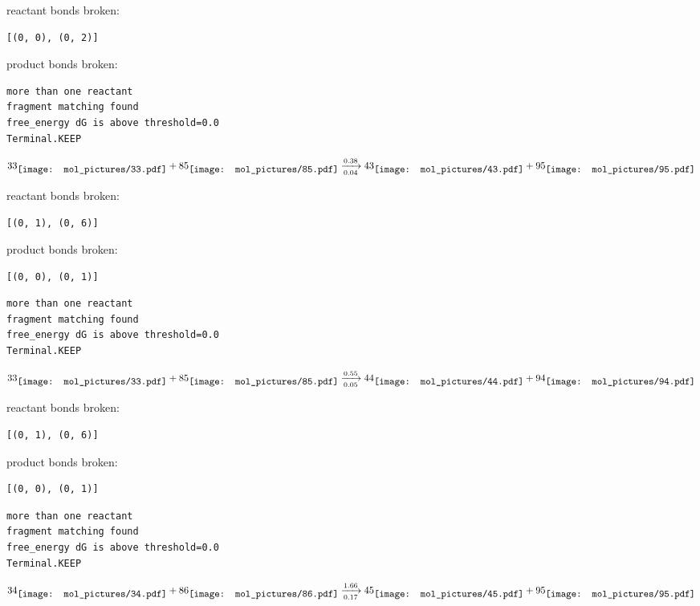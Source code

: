 \documentclass{article}
\begin{document}
reactant bonds broken:\begin{verbatim}
[(0, 0), (0, 2)]
\end{verbatim}
product bonds broken:



\vspace{1cm}
\begin{verbatim}
more than one reactant
fragment matching found
free_energy dG is above threshold=0.0
Terminal.KEEP
\end{verbatim}
$$
33
\raisebox{-.5\height}{\texttt{[image: mol\_pictures/33.pdf]}}
+
85
\raisebox{-.5\height}{\texttt{[image: mol\_pictures/85.pdf]}}
\xrightarrow[0.04]{0.38}
43
\raisebox{-.5\height}{\texttt{[image: mol\_pictures/43.pdf]}}
+
95
\raisebox{-.5\height}{\texttt{[image: mol\_pictures/95.pdf]}}
$$


reactant bonds broken:\begin{verbatim}
[(0, 1), (0, 6)]
\end{verbatim}
product bonds broken:\begin{verbatim}
[(0, 0), (0, 1)]
\end{verbatim}




\vspace{1cm}
\begin{verbatim}
more than one reactant
fragment matching found
free_energy dG is above threshold=0.0
Terminal.KEEP
\end{verbatim}
$$
33
\raisebox{-.5\height}{\texttt{[image: mol\_pictures/33.pdf]}}
+
85
\raisebox{-.5\height}{\texttt{[image: mol\_pictures/85.pdf]}}
\xrightarrow[0.05]{0.55}
44
\raisebox{-.5\height}{\texttt{[image: mol\_pictures/44.pdf]}}
+
94
\raisebox{-.5\height}{\texttt{[image: mol\_pictures/94.pdf]}}
$$


reactant bonds broken:\begin{verbatim}
[(0, 1), (0, 6)]
\end{verbatim}
product bonds broken:\begin{verbatim}
[(0, 0), (0, 1)]
\end{verbatim}




\vspace{1cm}
\begin{verbatim}
more than one reactant
fragment matching found
free_energy dG is above threshold=0.0
Terminal.KEEP
\end{verbatim}
$$
34
\raisebox{-.5\height}{\texttt{[image: mol\_pictures/34.pdf]}}
+
86
\raisebox{-.5\height}{\texttt{[image: mol\_pictures/86.pdf]}}
\xrightarrow[0.17]{1.66}
45
\raisebox{-.5\height}{\texttt{[image: mol\_pictures/45.pdf]}}
+
95
\raisebox{-.5\height}{\texttt{[image: mol\_pictures/95.pdf]}}
$$
\end{document}
